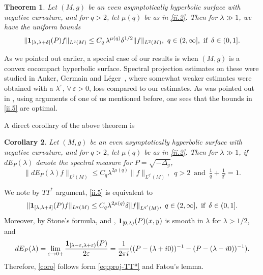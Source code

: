 \documentclass[10pt]{amsart}
\renewcommand{\epsilon}{\varepsilon}
\newtheorem{theorem}{Theorem}
\newtheorem{corr}[theorem]{Corollary}
\newcommand{\la}{\lambda}
\newcommand{\e}{\varepsilon}
\newcommand{\1}{{\bf 1}}
\renewcommand{\epsilon}{\varepsilon}
\begin{document}
\begin{theorem}\label{thm2}
Let $(M,g)$ be an even asymptotically hyperbolic surface with negative curvature, and for $q>2$,
let $\mu(q)$ be as in \eqref{ii.2}.  Then for  $\la \gg 1$, we have
the uniform bounds
\begin{equation}\label{ii.5}
\| \1_{[\la,\la+\delta]}(P)f\|_{L^q(M)}\le C_{q} \,  \la^{\mu(q)}\delta^{1/2}\|f\|_{L^2(M)}, \, \, q \in (2,\infty],
\, \, \text{if } \, \delta \in (0,1].
\end{equation}
\end{theorem}

As we pointed out earlier, a special case of our results is when $(M,g)$ is a convex cocompact hyperbolic surface.
Spectral projection estimates on these were studied in Anker, Germain and L\'eger~\cite{AGL}, where somewhat
weaker estimates were obtained with a $\la^\e$, $\forall \, \e>0$, loss compared to our estimates. As was pointed
out in \cite{AGL}, using arguments of one of us \cite{SFIO2} mentioned before, one sees that the bounds in
\eqref{ii.5} are optimal.  

A direct corollary of the above theorem is 
\begin{corr}\label{cor}
    Let $(M,g)$ be an even asymptotically hyperbolic surface with negative curvature, and for $q>2$,
let $\mu(q)$ be as in \eqref{ii.2}.  Then for  $\la \gg 1$, if $dE_{P}(\la)$ denote the spectral measure for $ P=\sqrt{-\Delta_g}$,
\begin{equation}\label{coro}
\| dE_{P}(\la)f\|_{L^q(M)}\le 
     C_{q}   \la^{2\mu(q)}\|f\|_{L^{q'}(M)},\,\,\, q>2 \,\,\,\text{and}\,\,\,\tfrac1q+\tfrac1{q'}=1.
\end{equation}
\end{corr}

We note by $TT^*$ argument, \eqref{ii.5} is equivalent to
\begin{equation}\label{eq:proj-TT*}
    \|\1_{[\lambda,\lambda+\delta]}(P)f\|_{L^q(M)}\leq C_q \lambda^{2\mu(q)}\delta \|f\|_{L^{q'}(M)}, \, \, q \in (2,\infty],
\, \, \text{if } \, \delta \in (0,1].
\end{equation}
Moreover, by Stone's formula, and \cite[Theorem 5.33]{dyatlov2019mathematical}, $\1_{[0,\lambda)}(P)(x,y)$ is smooth in $\lambda$ for $\lambda> 1/2$, and 
\begin{equation*}
    dE_P(\lambda)=\lim_{\epsilon\to 0+}\frac{\1_{[\lambda-\epsilon,\lambda+\epsilon)}(P)}{2\epsilon} = \frac{1}{2\pi i}((P-(\lambda+i0))^{-1}-(P-(\lambda-i0))^{-1}).
\end{equation*}
Therefore, \eqref{coro} follows form \eqref{eq:proj-TT*} and Fatou's lemma.
\end{document}
